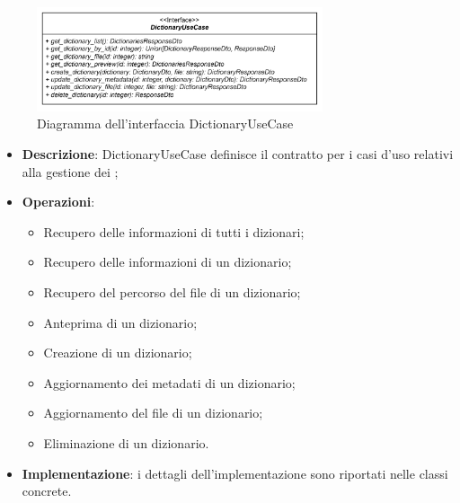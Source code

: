  \label{DictionaryUseCase}
\begin{figure}[H]
    \centering
    \includegraphics[width=0.75\textwidth]{assets/Backend/dictionary_use_case.png}
    \caption{Diagramma dell'interfaccia DictionaryUseCase}
  \end{figure}
\begin{itemize}
    \item \textbf{Descrizione}: DictionaryUseCase definisce il contratto per i casi d'uso relativi alla gestione dei ;
    \item \textbf{Operazioni}:
    \begin{itemize}
      \item Recupero delle informazioni di tutti i dizionari;
      \item Recupero delle informazioni di un dizionario;
      \item Recupero del percorso del file di un dizionario;
      \item Anteprima di un dizionario;
      \item Creazione di un dizionario;
      \item Aggiornamento dei metadati di un dizionario;
      \item Aggiornamento del file di un dizionario;
      \item Eliminazione di un dizionario.
    \end{itemize}
    \item \textbf{Implementazione}: i dettagli dell'implementazione sono riportati nelle classi concrete.
\end{itemize}  

